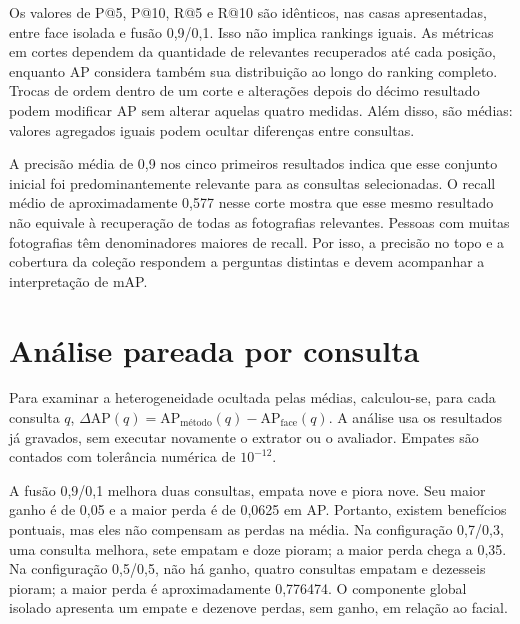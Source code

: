 Os valores de P@5, P@10, R@5 e R@10 são idênticos, nas casas apresentadas, entre face isolada e fusão 0,9/0,1. Isso não implica rankings iguais. As métricas em cortes dependem da quantidade de relevantes recuperados até cada posição, enquanto AP considera também sua distribuição ao longo do ranking completo. Trocas de ordem dentro de um corte e alterações depois do décimo resultado podem modificar AP sem alterar aquelas quatro medidas. Além disso, são médias: valores agregados iguais podem ocultar diferenças entre consultas.

A precisão média de 0,9 nos cinco primeiros resultados indica que esse conjunto inicial foi predominantemente relevante para as consultas selecionadas. O recall médio de aproximadamente 0,577 nesse corte mostra que esse mesmo resultado não equivale à recuperação de todas as fotografias relevantes. Pessoas com muitas fotografias têm denominadores maiores de recall. Por isso, a precisão no topo e a cobertura da coleção respondem a perguntas distintas e devem acompanhar a interpretação de mAP.

\section{Análise pareada por consulta}
Para examinar a heterogeneidade ocultada pelas médias, calculou-se, para cada consulta $q$, $\Delta\mathrm{AP}(q)=\mathrm{AP}_{\text{método}}(q)-\mathrm{AP}_{\mathrm{face}}(q)$. A análise usa os resultados já gravados, sem executar novamente o extrator ou o avaliador. Empates são contados com tolerância numérica de $10^{-12}$.

\begin{table}[htbp]
\centering\caption{Diferenças pareadas de AP em relação ao componente facial.}\label{tab:pareados}
\resizebox{\textwidth}{!}{}
\end{table}

A fusão 0,9/0,1 melhora duas consultas, empata nove e piora nove. Seu maior ganho é de 0,05 e a maior perda é de 0,0625 em AP. Portanto, existem benefícios pontuais, mas eles não compensam as perdas na média. Na configuração 0,7/0,3, uma consulta melhora, sete empatam e doze pioram; a maior perda chega a 0,35. Na configuração 0,5/0,5, não há ganho, quatro consultas empatam e dezesseis pioram; a maior perda é aproximadamente 0,776474. O componente global isolado apresenta um empate e dezenove perdas, sem ganho, em relação ao facial.

